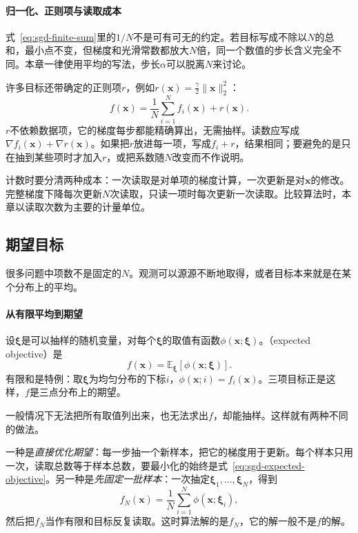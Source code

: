 \paragraph{归一化、正则项与读取成本}
式~\eqref{eq:sgd-finite-sum}里的$1/N$不是可有可无的约定。若目标写成不除以$N$的总和，最小点不变，但梯度和光滑常数都放大$N$倍，同一个数值的步长含义完全不同。本章一律使用平均的写法，步长$\alpha$可以脱离$N$来讨论。

许多目标还带确定的正则项$r$，例如$r(\bm{x})=\tfrac{\gamma}{2}\lVert\bm{x}\rVert_2^2$：
\begin{equation}
 f(\bm{x})=\frac{1}{N}\sum_{i=1}^{N}f_i(\bm{x})+r(\bm{x}).
 \label{eq:sgd-finite-sum-regularized}
\end{equation}
$r$不依赖数据项，它的梯度每步都能精确算出，无需抽样。读数应写成$\nabla f_i(\bm{x})+\nabla r(\bm{x})$。如果把$r$放进每一项，写成$f_i+r$，结果相同；要避免的是只在抽到某些项时才加入$r$，或把系数随$N$改变而不作说明。

计数时要分清两种成本：一次读取是对单项的梯度计算，一次更新是对$\bm{x}$的修改。完整梯度下降每次更新$N$次读取，只读一项时每次更新一次读取。比较算法时，本章以读取次数为主要的计量单位。

\subsection{期望目标}
\label{sec:sgd-expected}

很多问题中项数不是固定的$N$。观测可以源源不断地取得，或者目标本来就是在某个分布上的平均。

\paragraph{从有限平均到期望}
设$\bm{\xi}$是可以抽样的随机变量，对每个$\bm{\xi}$的取值有函数$\phi(\bm{x};\bm{\xi})$。（expected objective）是
\begin{equation}
 f(\bm{x})=\mathbb{E}_{\bm{\xi}}[\phi(\bm{x};\bm{\xi})].
 \label{eq:sgd-expected-objective}
\end{equation}
有限和是特例：取$\bm{\xi}$为均匀分布的下标$i$，$\phi(\bm{x};i)=f_i(\bm{x})$。三项目标正是这样，$f$是三点分布上的期望。

一般情况下无法把所有取值列出来，也无法求出$f$，却能抽样。这样就有两种不同的做法。

一种是\emph{直接优化期望}：每一步抽一个新样本，把它的梯度用于更新。每个样本只用一次，读取总数等于样本总数，要最小化的始终是式~\eqref{eq:sgd-expected-objective}。另一种是\emph{先固定一批样本}：一次抽定$\bm{\xi}_1,\ldots,\bm{\xi}_N$，得到
\[
 f_N(\bm{x})=\frac{1}{N}\sum_{i=1}^{N}\phi(\bm{x};\bm{\xi}_i),
\]
然后把$f_N$当作有限和目标反复读取。这时算法解的是$f_N$，它的解一般不是$f$的解。

